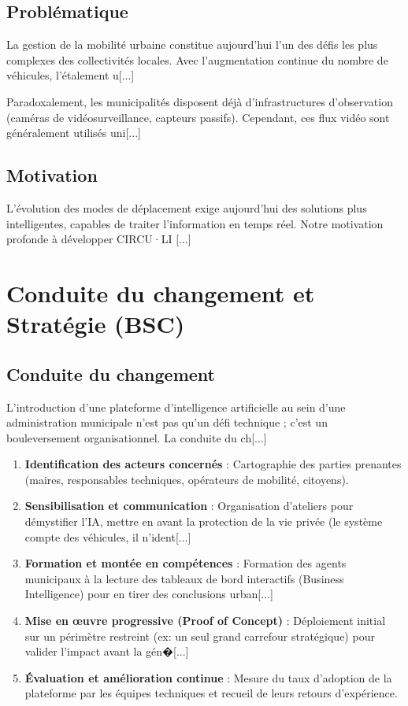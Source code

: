 \subsection{Problématique}
La gestion de la mobilité urbaine constitue aujourd’hui l’un des défis les plus complexes des collectivités locales. Avec l’augmentation continue du nombre de véhicules, l’étalement u[...]

Paradoxalement, les municipalités disposent déjà d'infrastructures d'observation (caméras de vidéosurveillance, capteurs passifs). Cependant, ces flux vidéo sont généralement utilisés uni[...]

\subsection{Motivation}
L’évolution des modes de déplacement exige aujourd’hui des solutions plus intelligentes, capables de traiter l'information en temps réel. Notre motivation profonde à développer CIRCU·LI [...]

\section{Conduite du changement et Stratégie (BSC)}

\subsection{Conduite du changement}
L’introduction d’une plateforme d'intelligence artificielle au sein d'une administration municipale n'est pas qu'un défi technique ; c'est un bouleversement organisationnel. La conduite du ch[...]
\begin{enumerate}
    \item \textbf{Identification des acteurs concernés} : Cartographie des parties prenantes (maires, responsables techniques, opérateurs de mobilité, citoyens).
    \item \textbf{Sensibilisation et communication} : Organisation d'ateliers pour démystifier l'IA, mettre en avant la protection de la vie privée (le système compte des véhicules, il n'ident[...]
    \item \textbf{Formation et montée en compétences} : Formation des agents municipaux à la lecture des tableaux de bord interactifs (Business Intelligence) pour en tirer des conclusions urban[...]
    \item \textbf{Mise en œuvre progressive (Proof of Concept)} : Déploiement initial sur un périmètre restreint (ex: un seul grand carrefour stratégique) pour valider l'impact avant la gén�[...]
    \item \textbf{Évaluation et amélioration continue} : Mesure du taux d'adoption de la plateforme par les équipes techniques et recueil de leurs retours d'expérience.
\end{enumerate}

